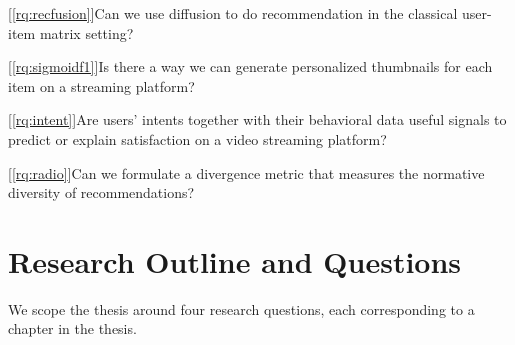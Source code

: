 
[\ref{rq:recfusion}]{Can we use diffusion to do recommendation in the classical user-item matrix setting?}

[\ref{rq:sigmoidf1}]{Is there a way we can generate personalized thumbnails for each item on a streaming platform?}

[\ref{rq:intent}]{Are users' intents together with their behavioral data useful signals to predict or explain satisfaction on a video streaming platform?}

[\ref{rq:radio}]{Can we formulate a divergence metric that measures the normative diversity of recommendations?}

\section{Research Outline and Questions}
\label{section:introduction:rqs}


We scope the thesis around four research questions, each corresponding to a chapter in the thesis.


